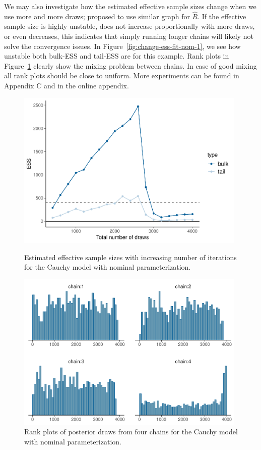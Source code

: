 \documentclass[american,]{article}
\theoremstyle{definition}
\begin{document}
We may also investigate how the estimated effective sample sizes
change when we use more and more draws; \citet{Brooks+Gelman:1998}
proposed to use similar graph for \(\widehat{R}\). If the effective
sample size is highly unstable, does not increase proportionally with
more draws, or even decreases, this indicates that simply running
longer chains will likely not solve the convergence issues. In
Figure~\ref{fig:change-ess-fit-nom-1}, we see how unstable both
bulk-ESS and tail-ESS are for this example.
%
Rank plots in Figure~\ref{fig:hist-fit-nom-1} clearly show the
mixing problem between chains. In case of good mixing all rank plots
should be close to uniform. More experiments can be found in Appendix C 
and in the online appendix.

\begin{figure}[tp]
  \centering
  \begin{minipage}{0.48\textwidth}
  \includegraphics[width=0.98\textwidth]{graphics/change-ess-fit-nom-1.pdf}
  \caption{Estimated effective sample sizes with increasing number of iterations
  for the Cauchy model with nominal parameterization.}
  \label{fig:change-ess-fit-nom-1}
\end{minipage}
\hfill
\begin{minipage}{0.48\textwidth}
  \includegraphics[width=0.98\textwidth]{graphics/hist-fit-nom-1.pdf}
  \caption{Rank plots of posterior draws from four chains for the Cauchy model 
  with nominal parameterization.}
  \label{fig:hist-fit-nom-1}
\end{minipage}
\end{figure}
\end{document}
